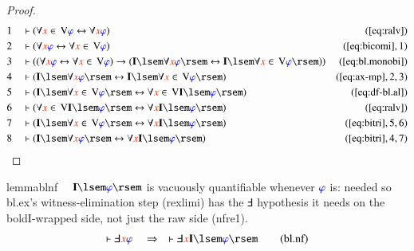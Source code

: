 \begin{proof}
\begin{align}
  1 &&  & \vdash ( \forall \msc{x} \in \,\mathrm{V} \mw{\varphi}
      \leftrightarrow \forall \msc{x} \mw{\varphi}
      )&(\mbox{\ref{eq:ralv}})\notag
  \\ 2 &&  & \vdash ( \forall \msc{x} \mw{\varphi} \leftrightarrow
      \forall \msc{x} \in \,\mathrm{V} \mw{\varphi}
      )&(\mbox{\ref{eq:bicomi}},1)\notag
  \\ 3 &&  & \vdash ( ( \forall \msc{x} \mw{\varphi} \leftrightarrow
      \forall \msc{x} \in \,\mathrm{V} \mw{\varphi} ) \rightarrow (
      \mathbf{I} \lsem \forall \msc{x} \mw{\varphi} \rsem
      \leftrightarrow \mathbf{I} \lsem \forall \msc{x} \in \,\mathrm{V}
      \mw{\varphi} \rsem ) )&(\mbox{\ref{eq:bl.monobi}})\notag
  \\ 4 &&  & \vdash ( \mathbf{I} \lsem \forall \msc{x} \mw{\varphi}
      \rsem \leftrightarrow \mathbf{I} \lsem \forall \msc{x} \in
      \,\mathrm{V} \mw{\varphi} \rsem
      )&(\mbox{\ref{eq:ax-mp}},2,3)\notag
  \\ 5 &&  & \vdash ( \mathbf{I} \lsem \forall \msc{x} \in \,\mathrm{V}
      \mw{\varphi} \rsem \leftrightarrow \forall \msc{x} \in
      \,\mathrm{V} \mathbf{I} \lsem \mw{\varphi} \rsem
      )&(\mbox{\ref{eq:df-bl.al}})\notag
  \\ 6 &&  & \vdash ( \forall \msc{x} \in \,\mathrm{V} \mathbf{I} \lsem
      \mw{\varphi} \rsem \leftrightarrow \forall \msc{x} \mathbf{I}
      \lsem \mw{\varphi} \rsem )&(\mbox{\ref{eq:ralv}})\notag
  \\ 7 &&  & \vdash ( \mathbf{I} \lsem \forall \msc{x} \in \,\mathrm{V}
      \mw{\varphi} \rsem \leftrightarrow \forall \msc{x} \mathbf{I}
      \lsem \mw{\varphi} \rsem )&(\mbox{\ref{eq:bitri}},5,6)\notag
  \\ 8 &&  & \vdash ( \mathbf{I} \lsem \forall \msc{x} \mw{\varphi}
      \rsem \leftrightarrow \forall \msc{x} \mathbf{I} \lsem
      \mw{\varphi} \rsem )&(\mbox{\ref{eq:bitri}},4,7)\notag
\end{align}
\end{proof}

\begin{restatable}{lemma}{blnf}~~ $\mathbf{I}\lsem\mw{\varphi}\rsem$ is vacuously quantifiable
whenever $\mw{\varphi}$ is: needed so bl.ex's witness-elimination step
(rexlimi) has the $\Finv$ hypothesis it needs on the boldI-wrapped side,
not just the raw side (nfre1).
\begin{align}
\vdash \Finv \msc{x} \mw{\varphi}\quad\Rightarrow\quad \vdash \Finv \msc{x}
    \mathbf{I} \lsem \mw{\varphi} \rsem\label{eq:bl.nf}\tag{bl.nf}
\end{align}
\end{restatable}

